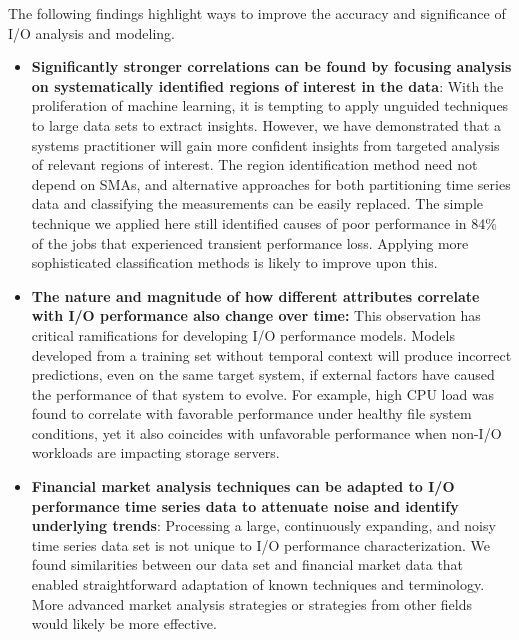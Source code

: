 The following findings highlight ways to improve the accuracy and significance of I/O analysis and modeling.

\begin{itemize}[leftmargin=*]

\item \textbf{Significantly stronger correlations can be found by focusing analysis on systematically identified regions of interest in the data}:
With the proliferation of machine learning, it is tempting to apply unguided techniques to large data sets to extract insights.
However, we have demonstrated that a systems practitioner will gain more confident insights from targeted analysis of relevant regions of interest.
The region identification method need not depend on SMAs, and alternative approaches for both partitioning time series data and classifying the measurements can be easily replaced.
The simple technique we applied here still identified causes of poor performance in 84\% of the jobs that experienced transient performance loss.
Applying more sophisticated classification methods is likely to improve upon this.


\item \textbf{The nature and magnitude of how different attributes correlate with I/O performance also change over time:}
This observation has critical ramifications for developing I/O performance models.
Models developed from a training set without temporal context will produce incorrect predictions, even on the same target system, if
external factors have caused the performance of that system to evolve.
For example, high CPU load was found to correlate with favorable performance under healthy file system conditions, yet it also coincides with unfavorable performance when non-I/O workloads are impacting storage servers.

\item \textbf{Financial market analysis techniques can be adapted to I/O performance time series data to attenuate noise and identify underlying trends}:
Processing a large, continuously expanding, and noisy time series data set is not unique to I/O performance characterization.
We found similarities between our data set and financial market data that enabled straightforward adaptation of known techniques and terminology.
More advanced market analysis strategies or strategies from other fields would likely be more effective.

\end{itemize}
